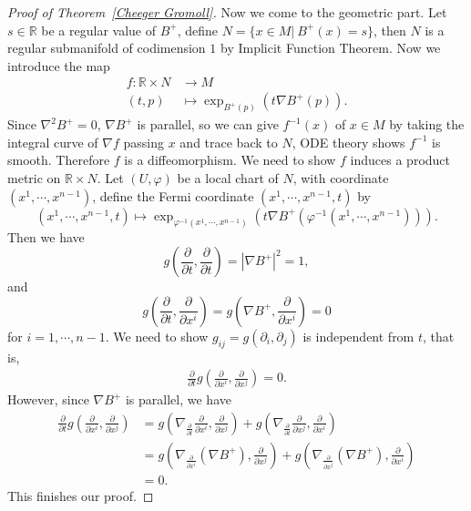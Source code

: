 \begin{proof}[Proof of Theorem~\ref{Cheeger Gromoll}]
    Now we come to the geometric part.
    Let $s\in\mathbb{R}$ be a regular value of $B^+$, define $N=\{x\in M|\ B^+(x)=s\}$, then $N$ is a regular submanifold of codimension $1$ by Implicit Function Theorem.
    Now we introduce the map
    \begin{align*}
        f:\mathbb{R}\times N&\to M\\
        (t,p)&\mapsto\exp_{B^+(p)}(t\nabla B^+(p)).
    \end{align*}
    Since $\nabla^2B^+=0$, $\nabla B^+$ is parallel, so we can give $f^{-1}(x)$ of $x\in M$ by taking the integral curve of $\nabla f$ passing $x$ and trace back to $N$, ODE theory shows $f^{-1}$ is smooth.
    Therefore $f$ is a diffeomorphism.
    We need to show $f$ induces a product metric on $\mathbb{R}\times N$.
    Let $(U,\varphi)$ be a local chart of $N$, with coordinate $(x^1,\cdots,x^{n-1})$, define the Fermi coordinate $(x^1,\cdots,x^{n-1},t)$ by
    \[(x^1,\cdots,x^{n-1},t)\mapsto\exp_{\varphi^{-1}(x^1,\cdots,x^{n-1})}(t\nabla B^+(\varphi^{-1}(x^1,\cdots,x^{n-1}))).\]
    Then we have
    \[g\left(\frac{\partial{}}{\partial{t}},\frac{\partial{}}{\partial{t}}\right)=|\nabla B^+|^2=1,\]
    and
    \[g\left(\frac{\partial{}}{\partial{t}},\frac{\partial{}}{\partial{x^i}}\right)=g\left(\nabla B^+,\frac{\partial{}}{\partial{x^i}}\right)=0\]
    for $i=1,\cdots,n-1$.
    We need to show $g_{ij}=g(\partial_i,\partial_j)$ is independent from $t$, that is,
    \begin{align*}
        \frac{\partial{}}{\partial{t}}g\left(\frac{\partial{}}{\partial{x^i}},\frac{\partial{}}{\partial{x^j}}\right)=0.
    \end{align*}
    However, since $\nabla B^+$ is parallel, we have
    \begin{align*}
        \frac{\partial{}}{\partial{t}}g\left(\frac{\partial{}}{\partial{x^i}},\frac{\partial{}}{\partial{x^j}}\right)&=g\left(\nabla_{\frac{\partial{}}{\partial{t}}}\frac{\partial{}}{\partial{x^i}},\frac{\partial{}}{\partial{x^j}}\right)+g\left(\nabla_{\frac{\partial{}}{\partial{t}}}\frac{\partial{}}{\partial{x^j}},\frac{\partial{}}{\partial{x^i}}\right)\\
        &=g\left(\nabla_{\frac{\partial{}}{\partial{x^i}}}(\nabla B^+),\frac{\partial{}}{\partial{x^j}}\right)+g\left(\nabla_{\frac{\partial{}}{\partial{x^j}}}(\nabla B^+),\frac{\partial{}}{\partial{x^i}}\right)\\
        &=0.
    \end{align*}
    This finishes our proof.
\end{proof}